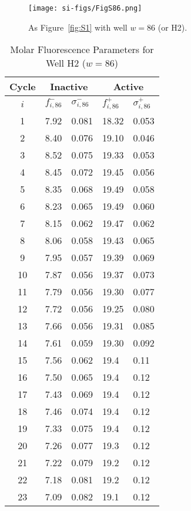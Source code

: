                 \begin{figure}
                    \centering
                    \texttt{[image: si-figs/FigS86.png]}
                    \caption{
                        As Figure~\ref{fig:S1} with well $w=86$ (or H2).
                    }
                \end{figure}
                \clearpage
    \begin{table}
        \caption{Molar Fluorescence Parameters for Well H2 ($w=86$)}
        \centering
        \begin{tabular}{c|ll|ll}
            Cycle & \multicolumn{2}{c|}{Inactive} & \multicolumn{2}{c}{Active} \\
            \hline
            $i$ & $f_{i,86}^{-}$ & $\sigma_{i,86}^{-}$ &  $f_{i,86}^{+}$ & $\sigma_{i,86}^{+}$ \\
            \hline
    1 & 7.92 & 0.081 & 18.32 & 0.053 \\
2 & 8.40 & 0.076 & 19.10 & 0.046 \\
3 & 8.52 & 0.075 & 19.33 & 0.053 \\
4 & 8.45 & 0.072 & 19.45 & 0.056 \\
5 & 8.35 & 0.068 & 19.49 & 0.058 \\
6 & 8.23 & 0.065 & 19.49 & 0.060 \\
7 & 8.15 & 0.062 & 19.47 & 0.062 \\
8 & 8.06 & 0.058 & 19.43 & 0.065 \\
9 & 7.95 & 0.057 & 19.39 & 0.069 \\
10 & 7.87 & 0.056 & 19.37 & 0.073 \\
11 & 7.79 & 0.056 & 19.30 & 0.077 \\
12 & 7.72 & 0.056 & 19.25 & 0.080 \\
13 & 7.66 & 0.056 & 19.31 & 0.085 \\
14 & 7.61 & 0.059 & 19.30 & 0.092 \\
15 & 7.56 & 0.062 & 19.4 & 0.11 \\
16 & 7.50 & 0.065 & 19.4 & 0.12 \\
17 & 7.43 & 0.069 & 19.4 & 0.12 \\
18 & 7.46 & 0.074 & 19.4 & 0.12 \\
19 & 7.33 & 0.075 & 19.4 & 0.12 \\
20 & 7.26 & 0.077 & 19.3 & 0.12 \\
21 & 7.22 & 0.079 & 19.2 & 0.12 \\
22 & 7.18 & 0.081 & 19.2 & 0.12 \\
23 & 7.09 & 0.082 & 19.1 & 0.12 \\

\end{tabular}
\end{table}
